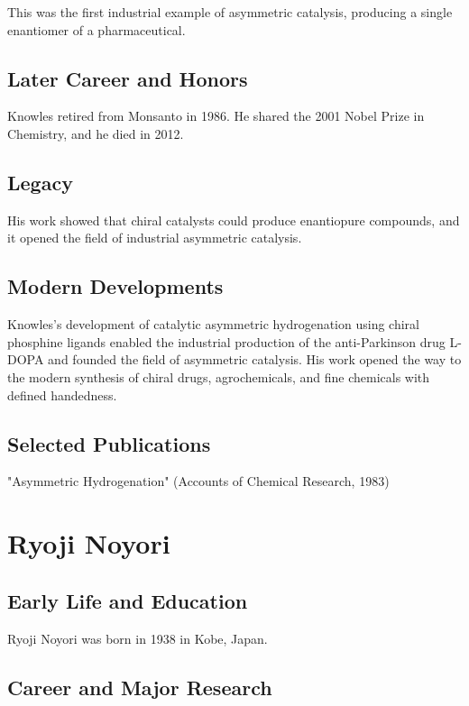 This was the first industrial example of asymmetric catalysis, producing a single enantiomer of a pharmaceutical.

\subsection*{Later Career and Honors}

Knowles retired from Monsanto in 1986. He shared the 2001 Nobel Prize in Chemistry, and he died in 2012.

\subsection*{Legacy}

His work showed that chiral catalysts could produce enantiopure compounds, and it opened the field of industrial asymmetric catalysis.

\subsection*{Modern Developments}

Knowles's development of catalytic asymmetric hydrogenation using chiral phosphine ligands enabled the industrial production of the anti-Parkinson drug L-DOPA and founded the field of asymmetric catalysis. His work opened the way to the modern synthesis of chiral drugs, agrochemicals, and fine chemicals with defined handedness.

\subsection*{Selected Publications}

"Asymmetric Hydrogenation" (Accounts of Chemical Research, 1983)

\clearpage

\section{Ryoji Noyori}

\subsection*{Early Life and Education}

Ryoji Noyori was born in 1938 in Kobe, Japan.

\subsection*{Career and Major Research}

